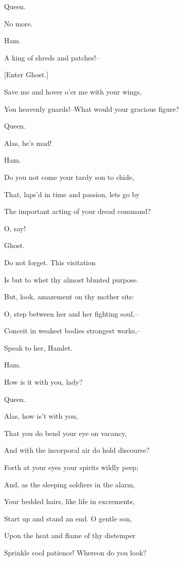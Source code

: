 \documentclass[12pt]{book}
\begin{document}
Queen.

No more.



Ham.

A king of shreds and patches!--



[Enter Ghost.]



Save me and hover o'er me with your wings,

You heavenly guards!--What would your gracious figure?



Queen.

Alas, he's mad!



Ham.

Do you not come your tardy son to chide,

That, laps'd in time and passion, lets go by

The important acting of your dread command?

O, say!



Ghost.

Do not forget. This visitation

Is but to whet thy almost blunted purpose.

But, look, amazement on thy mother sits:

O, step between her and her fighting soul,--

Conceit in weakest bodies strongest works,--

Speak to her, Hamlet.



Ham.

How is it with you, lady?



Queen.

Alas, how is't with you,

That you do bend your eye on vacancy,

And with the incorporal air do hold discourse?

Forth at your eyes your spirits wildly peep;

And, as the sleeping soldiers in the alarm,

Your bedded hairs, like life in excrements,

Start up and stand an end. O gentle son,

Upon the heat and flame of thy distemper

Sprinkle cool patience! Whereon do you look?
\end{document}
